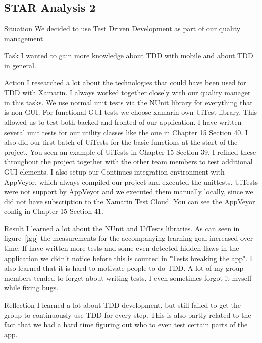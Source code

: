 \documentclass[12pt]{article}
\begin{document}
\subsection{STAR Analysis 2}
\begin{STAR}
    \item[Situation] We decided to use Test Driven Development as part of our quality management. 
    \item[Task] I wanted to gain more knowledge about TDD with mobile and about TDD in general. 
    \item[Action] I researched a lot about the technologies that could have been used for TDD with Xamarin. I always worked together closely with our quality manager in this tasks. We use normal unit tests via the NUnit library for everything that is non GUI. For functional GUI tests we choose xamarin own UiTest library. This allowed us to test both backed and fronted of our application. I have written several unit tests for our utility classes like the one in Chapter 15 Section 40. I also did our first batch of UiTests for the basic functions at the start of the project. You seen an example of UiTests in Chapter 15 Section 39. I refined these throughout the project together with the other team members to test additional GUI elements. I also setup our Continues integration environment with AppVeyor, which always compiled our project and executed the unittests. UiTests were not support by AppVeyor and we executed them manually locally, since we did not have subscription to the Xamarin Test Cloud. You can see the AppVeyor config in Chapter 15 Section 41.
    \item[Result] I learned a lot about the NUnit and UiTests libraries. 
    As can seen in figure~\ref{lgp} the measurements for the accompanying learning goal increased over time. If have written more tests and some even detected hidden flaws in the application we didn't notice before this is counted in "Tests breaking the app". I also learned that it is hard to motivate people to do TDD. A lot of my group members tended to forget about writing tests, I even sometimes forgot it myself while fixing bugs.
    \item[Reflection] I learned a lot about TDD development, but still failed to get the group to continuously use TDD for every step. This is also partly related to the fact that we had a hard time figuring out who to even test certain parts of the app.
\end{STAR}

\clearpage
\end{document}
